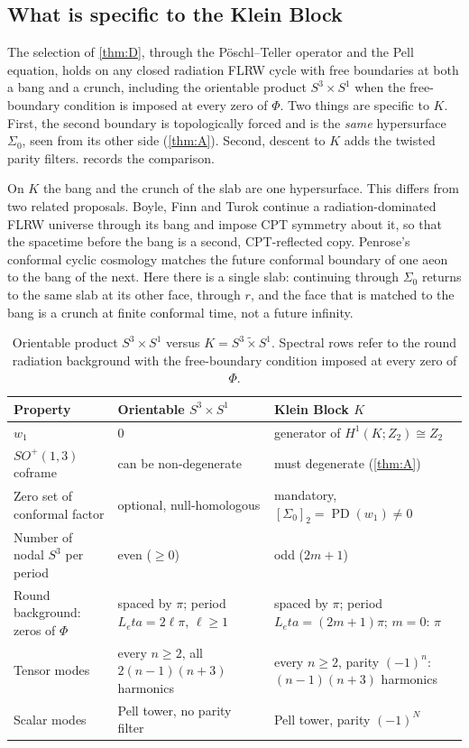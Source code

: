 \documentclass[11pt]{article}
\theoremstyle{canonmath}
\theoremstyle{canonpostulate}
\theoremstyle{canonproposition}
\theoremstyle{canonmath}
\theoremstyle{canonproposition}
\providecommand{\PD}{\operatorname{PD}}
\providecommand{\Klein}{\mathcal{K}}
\providecommand{\Ztwo}{\mathbb{Z}_2}
\def\mathbb#1{#1}%
\def\mathcal#1{#1}%
\def\eta{eta}%
\begin{document}
\subsection*{What is specific to the Klein Block}

The selection of \cref{thm:D}, through the Pöschl--Teller operator \cite{PoschlTeller1933} and the Pell equation, holds on any closed radiation FLRW cycle with free boundaries at both a bang and a crunch, including the orientable product $S^3\times S^1$ when the free-boundary condition is imposed at every zero of $\Phi$. Two things are specific to $\Klein$. First, the second boundary is topologically forced and is the \emph{same} hypersurface $\Sigma_0$, seen from its other side (\cref{thm:A}). Second, descent to $\Klein$ adds the twisted parity filters.  records the comparison.

On $\Klein$ the bang and the crunch of the slab are one hypersurface. This differs from two related proposals. Boyle, Finn and Turok \cite{BFT2018} continue a radiation-dominated FLRW universe through its bang and impose CPT symmetry about it, so that the spacetime before the bang is a second, CPT-reflected copy. Penrose's conformal cyclic cosmology \cite{Penrose2010} matches the future conformal boundary of one aeon to the bang of the next. Here there is a single slab: continuing through $\Sigma_0$ returns to the same slab at its other face, through $r$, and the face that is matched to the bang is a crunch at finite conformal time, not a future infinity.

\begin{table}[H]
\centering
\caption{Orientable product $S^3\times S^1$ versus $\Klein = S^3 \tilde{\times} S^1$. Spectral rows refer to the round radiation background with the free-boundary condition imposed at every zero of $\Phi$.}
\label{tab:comparison}
\renewcommand{\arraystretch}{1.2}
\begin{tabularx}{\textwidth}{>{\raggedright\arraybackslash}p{3.7cm} >{\raggedright\arraybackslash}X >{\raggedright\arraybackslash}X}
\toprule
\textbf{Property} & \textbf{Orientable $S^3 \times S^1$} & \textbf{Klein Block $\Klein$} \\
\midrule
$w_1$ & $0$ & generator of $H^1(\Klein;\Ztwo)\cong\Ztwo$ \\
$SO^+(1,3)$ coframe & can be non-degenerate & must degenerate (\cref{thm:A}) \\
Zero set of conformal factor & optional, null-homologous & mandatory, $[\Sigma_0]_2 = \PD(w_1) \neq 0$ \\
Number of nodal $S^3$ per period & even ($\ge 0$) & odd ($2m+1$) \\
Round background: zeros of $\Phi$ & spaced by $\pi$; period $L_\eta = 2\ell\pi$, $\ell\ge1$ & spaced by $\pi$; period $L_\eta = (2m+1)\pi$; $m=0$: $\pi$ \\
Tensor modes & every $n \ge 2$, all $2(n-1)(n+3)$ harmonics & every $n \ge 2$, parity $(-1)^n$: $(n-1)(n+3)$ harmonics \\
Scalar modes & Pell tower, no parity filter & Pell tower, parity $(-1)^N$ \\
\bottomrule
\end{tabularx}
\end{table}
\end{document}
